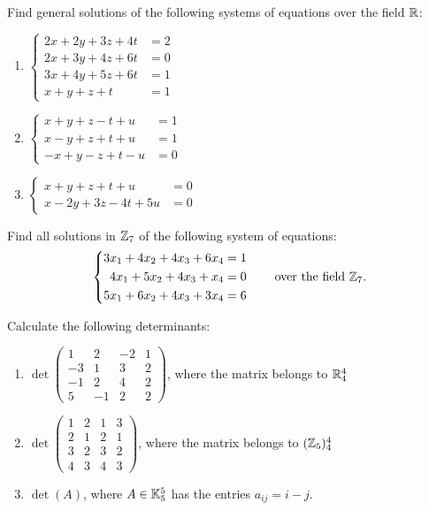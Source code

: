 \begin{exercise}
Find general solutions of the following systems of equations over the field $\mathbb{R}$:
\begin{enumerate}[label=(\alph*)]
\item $\left\{ \begin{aligned}
2x + 2y + 3z + 4t &= 2\\
2x + 3y + 4z + 6t &= 0\\
3x + 4y + 5z + 6t &= 1\\
x + y + z + t &= 1
\end{aligned} \right.$
\item $\left\{ \begin{aligned}
x + y + z - t + u &= 1\\
x - y + z + t + u &= 1\\
-x + y - z + t - u &= 0
\end{aligned} \right.$
\item $\left\{ \begin{aligned}
x + y + z + t + u &= 0\\
x - 2y + 3z - 4t + 5u &= 0
\end{aligned} \right.$
\end{enumerate}
\end{exercise}

\begin{exercise}
Find all solutions in $\mathbb{Z}_7$ of the following system of equations:
\[
\left\{ \begin{aligned}
3x_1 + 4x_2 + 4x_3 + 6x_4 &= 1\\
4x_1 + 5x_2 + 4x_3 + x_4 &= 0\\
5x_1 + 6x_2 + 4x_3 + 3x_4 &= 6
\end{aligned} \right.
\qquad \text{over the field } \mathbb{Z}_7.
\]
\end{exercise}

\begin{exercise}
Calculate the following determinants:
\begin{enumerate}[label=(\alph*)]
\item $\det \left( \begin{array}{cccc}
1 & 2 & -2 & 1\\ -3 & 1 & 3 & 2\\ -1 & 2 & 4 & 2\\ 5 & -1 & 2 & 2
\end{array} \right)$, where the matrix belongs to $\mathbb{R}_4^4$
\item $\det \left( \begin{array}{cccc}
1 & 2 & 1 & 3\\ 2 & 1 & 2 & 1\\ 3 & 2 & 3 & 2\\ 4 & 3 & 4 & 3
\end{array} \right)$, where the matrix belongs to $(\mathbb{Z}_5)_4^4$
\item $\det(A)$, where $A\in \mathbb{K}_5^5$ has the entries $a_{ij} = i-j$.
\end{enumerate}
\end{exercise}

